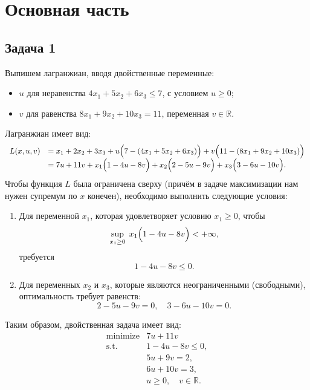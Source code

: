 \documentclass[a4paper,12pt]{article}
\title{}
\author{}
\date{}
\begin{document}
	
	\maketitle
	
	\bigskip

	
	\section*{Основная часть}
	
	\subsection*{Задача 1 }
	
	
	\medskip
	
	Выпишем лагранжиан, вводя двойственные переменные:
	\begin{itemize}[leftmargin=1cm]
	 \item $u$ для неравенства $4x_1+5x_2+6x_3\le 7$, с условием $u\ge0$;
	 
	 \item $v$ для равенства $8x_1+9x_2+10x_3=11$, переменная $v\in\mathbb{R}$.
	\end{itemize}
	
	Лагранжиан имеет вид:
	\[
	\begin{array}{rl}
		L(x,u,v) &= x_1+2x_2+3x_3 + u\Bigl(7 - (4x_1+5x_2+6x_3)\Bigr) + v\Bigl(11 - (8x_1+9x_2+10x_3)\Bigr)\\[1mm]
		&= 7u + 11v + x_1\Bigl(1-4u-8v\Bigr) + x_2\Bigl(2-5u-9v\Bigr) + x_3\Bigl(3-6u-10v\Bigr).
	\end{array}
	\]
	Чтобы функция $L$ была ограничена сверху (причём в задаче максимизации нам нужен супремум по $x$ конечен), необходимо выполнить следующие условия:
	\begin{enumerate}
		\item Для переменной $x_1$, которая удовлетворяет условию $x_1\ge 0$, чтобы 
		\[
		\sup_{x_1\ge 0}\; x_1\Bigl(1-4u-8v\Bigr) < +\infty,
		\]
		требуется
		\[
		1-4u-8v\le 0.
		\]
		\item Для переменных $x_2$ и $x_3$, которые являются неограниченными (свободными), оптимальность требует равенств:
		\[
		2-5u-9v = 0,\quad 3-6u-10v = 0.
		\]
	\end{enumerate}
	Таким образом, двойственная задача имеет вид:
	\[
	\begin{array}{rl}
		\text{minimize} & 7u+11v\\[1mm]
		\text{s.t.} & 1-4u-8v \le 0,\\[1mm]
		& 5u+9v = 2,\\[1mm]
		& 6u+10v = 3,\\[1mm]
		& u\ge 0,\quad v\in \mathbb{R}.
	\end{array}
	\]
	\vspace{2mm}
	
\end{document}
